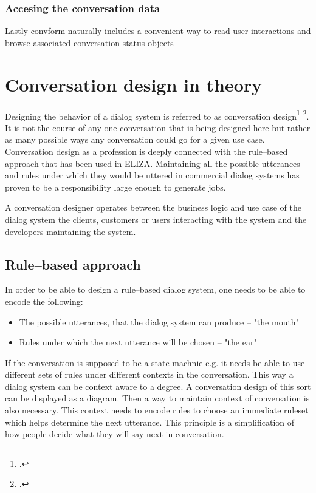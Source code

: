 \documentclass[12pt]{report}
\begin{document}
{\subsubsection{Accesing the conversation data}
Lastly convform naturally includes a convenient way to read user interactions
and browse associated conversation status objects

\section{Conversation design in theory}

\par
Designing the behavior of a dialog system
is referred to as conversation design\footcite{kolosova2022} \footcite{mctear2020conversational}.
It is not the course of any one conversation that is being designed here
but rather as many possible ways any conversation could go
for a given use case.
Conversation design as a profession is deeply connected
with the rule–based approach that has been used in ELIZA.
Maintaining all the possible utterances and
rules under which they would be uttered
in commercial dialog systems
has proven to be a responsibility large enough
to generate jobs.

A conversation designer operates between
the business logic and use case of the dialog system
the clients, customers or users interacting with the system
and the developers maintaining the system.

\subsection{Rule–based approach}

In order to be able to design a rule–based dialog system,
one needs to be able to encode the following:

    \begin{itemize}

        \item
        The possible utterances, that the dialog system can produce – "the mouth"

        \item
        Rules under which the next utterance will be chosen – "the ear"

    \end{itemize}

\par
If the conversation is supposed to be a state machnie e.g.
it needs be able to use different sets of rules
under different contexts in the conversation.
This way a dialog system can be context aware to a degree.
A conversation design of this sort
can be displayed as a diagram.
Then a way to maintain context of conversation is also necessary.
This context needs to encode rules to choose an immediate ruleset
which helps determine the next utterance.
This principle is a simplification of
how people decide what they will say next in conversation.

}
\end{document}
